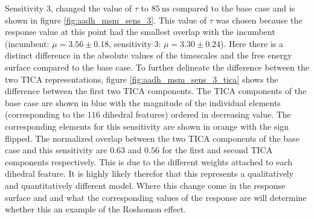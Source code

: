 Sensitivity 3, changed the value of $\tau$ to $\SI{85}{\nano\second}$ compared to the base case and is shown in figure \ref{fig:aadh_msm_sens_3}.   This value of $\tau$ was chosen because the response value at this point had the smallest  overlap with the incumbent (incumbent: $\mu=3.56 \pm 0.18$, sensitivity 3: $\mu=3.30 \pm 0.24$).  Here there is a distinct difference in the absolute values of the timescales and the free energy surface compared to the base case. To further delineate the difference between the two TICA representations, figure \ref{fig:aadh_msm_sens_3_tica} shows the difference between the first two TICA components. The  TICA components of the base case are shown in blue with the magnitude of the individual elements (corresponding to the $116$ dihedral features) ordered in decreasing value. The corresponding elements for this sensitivity are shown in orange with the sign flipped. The normalized overlap between the two TICA components of the base case and this sensitivity are $0.63$ and $0.56$  for the first and second TICA components respectively. This is due to the different weights attached to each dihedral feature. It is highly likely therefor that this represents a qualitatively and quantitatively different model. Where this change come in the response surface and and what the corresponding values of the response are will determine whether this an example of the Roshomon effect. 

